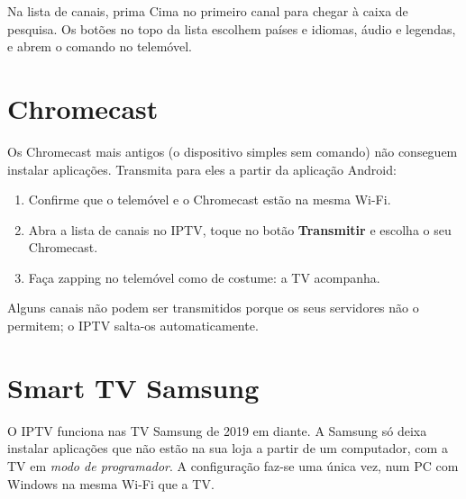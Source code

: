 Na lista de canais, prima Cima no primeiro canal para chegar à caixa de
pesquisa. Os botões no topo da lista escolhem países e idiomas, áudio e
legendas, e abrem o comando no telemóvel.


\section{Chromecast}
\label{sec:chromecast}

Os Chromecast mais antigos (o dispositivo simples sem comando) não conseguem
instalar aplicações. Transmita para eles a partir da aplicação Android:
\begin{enumerate}
  \item Confirme que o telemóvel e o Chromecast estão na mesma Wi-Fi.
  \item Abra a lista de canais no IPTV, toque no botão \textbf{Transmitir} e
        escolha o seu Chromecast.
  \item Faça zapping no telemóvel como de costume: a TV acompanha.
\end{enumerate}
Alguns canais não podem ser transmitidos porque os seus servidores não o
permitem; o IPTV salta-os automaticamente.

\section{Smart TV Samsung}

O IPTV funciona nas TV Samsung de 2019 em diante. A Samsung só deixa instalar
aplicações que não estão na sua loja a partir de um computador, com a TV em
\emph{modo de programador}. A configuração faz-se uma única vez, num PC com
Windows na mesma Wi-Fi que a TV.

